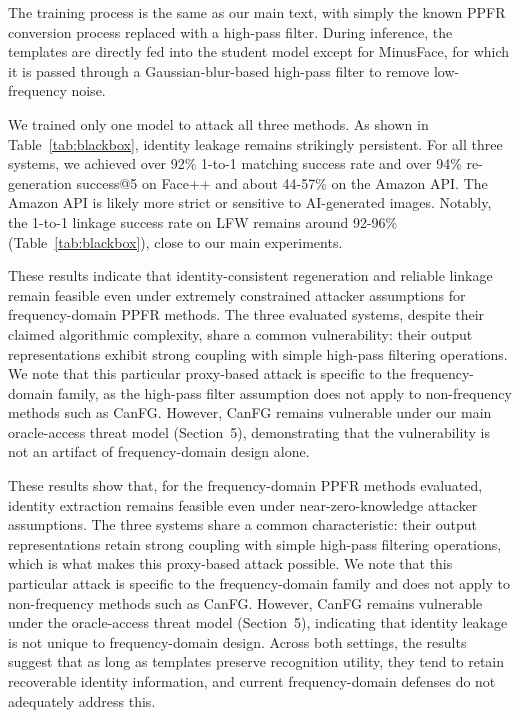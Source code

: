 The training process is the same as our main text, with simply the known PPFR conversion process replaced with a high-pass filter. During inference, the templates are directly fed into the student model except for MinusFace, for which it is passed through a Gaussian-blur-based high-pass filter to remove low-frequency noise.

We trained only one model to attack all three methods. As shown in Table~\ref{tab:blackbox}, identity leakage remains strikingly persistent. For all three systems, we achieved over 92\% 1-to-1 matching success rate and over 94\% re-generation success@5 on Face++ and about 44-57\% on the Amazon API. The Amazon API is likely more strict or sensitive to AI-generated images. Notably, the 1-to-1 linkage success rate on LFW remains around 92-96\% (Table~\ref{tab:blackbox}), close to our main experiments. 


These results indicate that identity-consistent regeneration and reliable linkage remain feasible even under extremely constrained attacker assumptions for frequency-domain PPFR methods. The three evaluated systems, despite their claimed algorithmic complexity, share a common vulnerability: their output representations exhibit strong coupling with simple high-pass filtering operations. We note that this particular proxy-based attack is specific to the frequency-domain family, as the high-pass filter assumption does not apply to non-frequency methods such as CanFG. However, CanFG remains vulnerable under our main oracle-access threat model (Section~5), demonstrating that the vulnerability is not an artifact of frequency-domain design alone.

These results show that, for the frequency-domain PPFR methods evaluated, identity extraction remains feasible even under near-zero-knowledge attacker assumptions. The three systems share a common characteristic: their output representations retain strong coupling with simple high-pass filtering operations, which is what makes this proxy-based attack possible. We note that this particular attack is specific to the frequency-domain family and does not apply to non-frequency methods such as CanFG. However, CanFG remains vulnerable under the oracle-access threat model (Section~5), indicating that identity leakage is not unique to frequency-domain design. Across both settings, the results suggest that as long as templates preserve recognition utility, they tend to retain recoverable identity information, and current frequency-domain defenses do not adequately address this.







